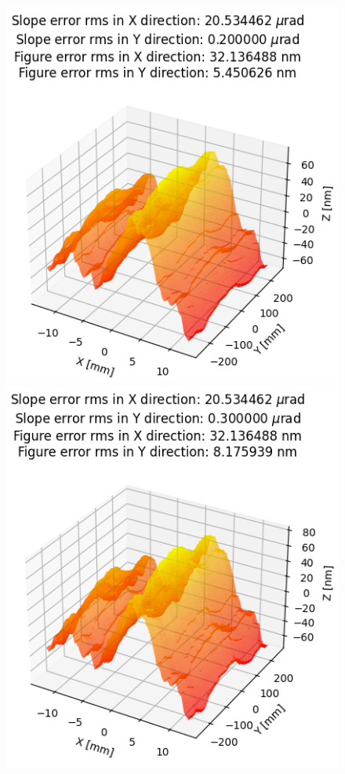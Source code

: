 \begin{figure}[!htb]
  \includegraphics[width=\linewidth]{./../figures/slope_error/surface_error_profile_500x25_02x20urad.png}
\endminipage\hfill
{}
  \includegraphics[width=\linewidth]{./../figures/slope_error/surface_error_profile_500x25_03x20urad.png}

\end{figure}
